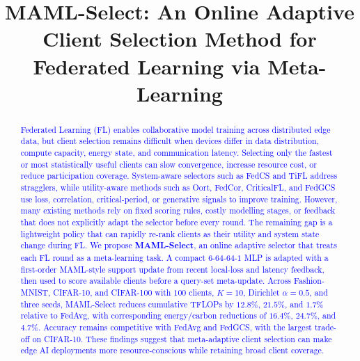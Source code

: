 \documentclass[journal]{IEEEtran}
\newcommand{\revision}[1]{\textcolor{blue}{#1}}
\begin{document}
\title{MAML-Select: An Online Adaptive Client Selection Method for Federated Learning via Meta-Learning}


\maketitle

\begin{abstract}
\revision{Federated Learning (FL) enables collaborative model training across distributed edge data, but client selection remains difficult when devices differ in data distribution, compute capacity, energy state, and communication latency. Selecting only the fastest or most statistically useful clients can slow convergence, increase resource cost, or reduce participation coverage. System-aware selectors such as FedCS and TiFL address stragglers, while utility-aware methods such as Oort, FedCor, CriticalFL, and FedGCS use loss, correlation, critical-period, or generative signals to improve training. However, many existing methods rely on fixed scoring rules, costly modelling stages, or feedback that does not explicitly adapt the selector before every round. The remaining gap is a lightweight policy that can rapidly re-rank clients as their utility and system state change during FL. We propose \textbf{MAML-Select}, an online adaptive selector that treats each FL round as a meta-learning task. A compact $6$-$64$-$64$-$1$ MLP is adapted with a first-order MAML-style support update from recent local-loss and latency feedback, then used to score available clients before a query-set meta-update. Across Fashion-MNIST, CIFAR-10, and CIFAR-100 with $100$ clients, $K=10$, Dirichlet $\alpha=0.5$, and three seeds, MAML-Select reduces cumulative TFLOPs by $12.8\%$, $21.5\%$, and $1.7\%$ relative to FedAvg, with corresponding energy/carbon reductions of $16.4\%$, $24.7\%$, and $4.7\%$. Accuracy remains competitive with FedAvg and FedGCS, with the largest trade-off on CIFAR-10. These findings suggest that meta-adaptive client selection can make edge AI deployments more resource-conscious while retaining broad client coverage.}
\end{abstract}
\end{document}
